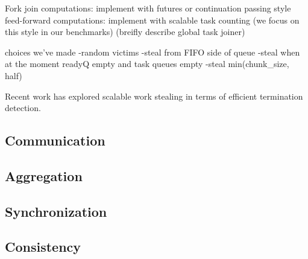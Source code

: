 Fork join computations: implement with futures or continuation passing
style
feed-forward computations: implement with scalable task counting (we
focus on this style in our benchmarks)
(breifly describe global task joiner)

choices we've made
-random victims
-steal from FIFO side of queue
-steal when at the moment readyQ empty and task queues empty
-steal min(chunk\_size, half)

Recent work has explored scalable work stealing in terms of efficient
termination detection. 



\subsection{Communication}


\subsection{Aggregation}

\subsection{Synchronization}

\subsection{Consistency}
